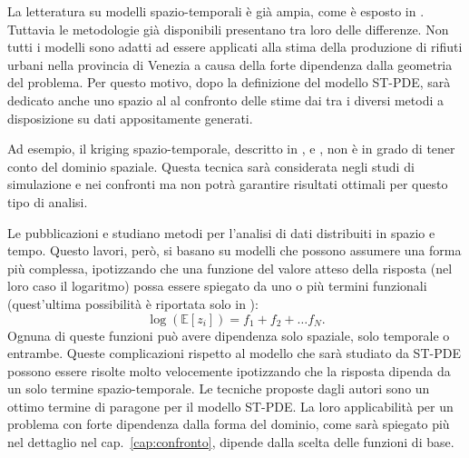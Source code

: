 \documentclass[a4paper,11pt,twoside,openright]{book}							%
\begin{document}
La letteratura su modelli spazio-temporali è già ampia, come è esposto in \cite{art:cressie}. Tuttavia le metodologie già disponibili presentano tra loro delle differenze. Non tutti i modelli sono adatti ad essere applicati alla stima della produzione di rifiuti urbani nella provincia di Venezia a causa della forte dipendenza dalla geometria del problema. Per questo motivo, dopo la definizione del modello ST-PDE, sarà dedicato anche uno spazio al al confronto delle stime dai tra i diversi metodi a disposizione su dati appositamente generati.

Ad esempio, il kriging spazio-temporale, descritto in \cite{art:caballero}, \cite{art:menafoglio2} e \cite{art:menafoglio1}, non è in grado di tener conto del dominio spaziale. Questa tecnica sarà considerata negli studi di simulazione e nei confronti ma non potrà garantire risultati ottimali per questo tipo di analisi.

Le pubblicazioni \cite{art:augustin} e \cite{art:marra} studiano metodi per l'analisi di dati distribuiti in spazio e tempo. Questo lavori, però, si basano su modelli che possono assumere una forma più complessa, ipotizzando che una funzione del valore atteso della risposta (nel loro caso il logaritmo) possa essere spiegato da uno o più termini funzionali (quest'ultima possibilità è riportata solo in \cite{art:augustin}):
$$
\log(\mathbb{E}[z_i])= f_1+f_2+ \ldots f_N .
$$
Ognuna di queste funzioni può avere dipendenza solo spaziale, solo temporale o entrambe. Queste complicazioni rispetto al modello che sarà studiato da ST-PDE possono essere risolte molto velocemente ipotizzando che la risposta dipenda da un solo termine spazio-temporale. Le tecniche proposte dagli autori sono un ottimo termine di paragone per il modello ST-PDE. La loro applicabilità per un problema con forte dipendenza dalla forma del dominio, come sarà spiegato più nel dettaglio nel cap.~\ref{cap:confronto}, dipende dalla scelta delle funzioni di base. 
\end{document}
